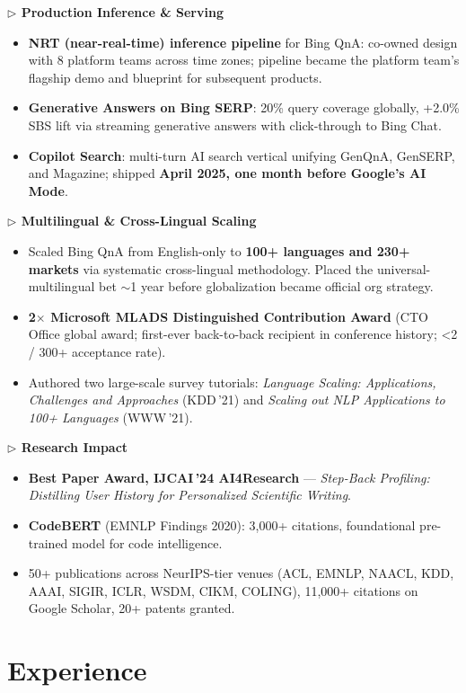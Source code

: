 \documentclass[10.5pt,letterpaper]{article}
\newcommand{\subhead}[1]{\smallskip\noindent\textcolor{blue!60!black}{\textbf{$\triangleright$ #1}}\par\vspace{1pt}}
\begin{document}
\subhead{Production Inference \& Serving}
\begin{itemize}
  \item \textbf{NRT (near-real-time) inference pipeline} for Bing QnA: co-owned design with 8 platform teams across time zones; pipeline became the platform team's flagship demo and blueprint for subsequent products.
  \item \textbf{Generative Answers on Bing SERP}: 20\% query coverage globally, +2.0\% SBS lift via streaming generative answers with click-through to Bing Chat.
  \item \textbf{Copilot Search}: multi-turn AI search vertical unifying GenQnA, GenSERP, and Magazine; shipped \textbf{April 2025, one month before Google's AI Mode}.
\end{itemize}

\subhead{Multilingual \& Cross-Lingual Scaling}
\begin{itemize}
  \item Scaled Bing QnA from English-only to \textbf{100+ languages and 230+ markets} via systematic cross-lingual methodology. Placed the universal-multilingual bet $\sim$1 year before globalization became official org strategy.
  \item \textbf{2$\times$ Microsoft MLADS Distinguished Contribution Award} (CTO Office global award; first-ever back-to-back recipient in conference history; <2 / 300+ acceptance rate).
  \item Authored two large-scale survey tutorials: \textit{Language Scaling: Applications, Challenges and Approaches} (KDD\,'21) and \textit{Scaling out NLP Applications to 100+ Languages} (WWW\,'21).
\end{itemize}

\subhead{Research Impact}
\begin{itemize}
  \item \textbf{Best Paper Award, IJCAI\,'24 AI4Research} --- \textit{Step-Back Profiling: Distilling User History for Personalized Scientific Writing}.
  \item \textbf{CodeBERT} (EMNLP Findings 2020): 3,000+ citations, foundational pre-trained model for code intelligence.
  \item 50+ publications across NeurIPS-tier venues (ACL, EMNLP, NAACL, KDD, AAAI, SIGIR, ICLR, WSDM, CIKM, COLING), 11,000+ citations on Google Scholar, 20+ patents granted.
\end{itemize}

\section*{Experience}
\end{document}
